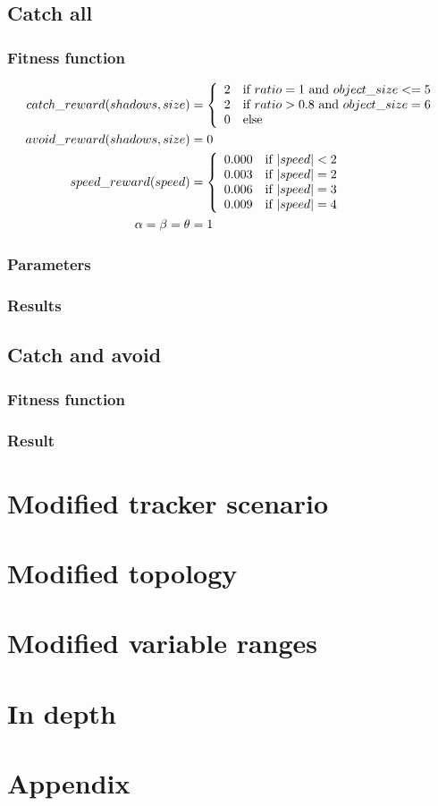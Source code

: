 \documentclass[10pt]{article}
\begin{document}
	\subsection{Catch all}
		\subsubsection{Fitness function}
			\begin{align}
				catch\_reward(shadows, size) &= \left\{ 
				\begin{array}{l l}
					2 &\text{if $ratio=1$ and $object\_size <= 5$} \\
					2 &\text{if $ratio>0.8$ and $object\_size = 6$}\\
					0 &\text{else}
       \end{array} \right.\nonumber\\
				avoid\_reward(shadows, size) &= 0\nonumber\\
				speed\_reward(speed) &= \left\{ 
				\begin{array}{l l}
					0.000 &\text{if $|speed| < 2$} \\
					0.003 &\text{if $|speed| = 2$} \\
					0.006 &\text{if $|speed| = 3$} \\
					0.009 &\text{if $|speed| = 4$} \\
       \end{array} \right.\nonumber\\
			 \alpha =\beta =\theta &= 1\nonumber\\
			\end{align}
		\subsubsection{Parameters}
		\subsubsection{Results}
	\subsection{Catch and avoid}
		\subsubsection{Fitness function}
		\subsubsection{Result}
\section{Modified tracker scenario}
\section{Modified topology}
\section{Modified variable ranges}
\section{In depth}
\section{Appendix}
	
\end{document}
